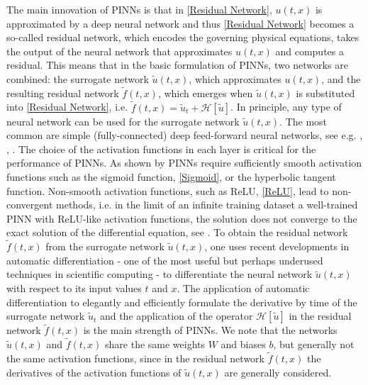 The main innovation of PINNs is that in \cref{Residual Network}, $u(t,x)$ is approximated by a deep neural network and thus \cref{Residual Network} becomes a so-called residual network, which encodes the governing physical equations, takes the output of the neural network that approximates $u(t,x)$ and computes a residual. This means that in the basic formulation of PINNs, two networks are combined: the surrogate network $\widetilde{u}(t,x)$, which approximates $u(t,x)$, and the resulting residual network $\widetilde{f}(t,x)$, which emerges when $\widetilde{u}(t,x)$ is substituted into \cref{Residual Network}, i.e. $\widetilde{f}(t,x) = \widetilde{u}_t + \mathcal{H} \left[ \widetilde{u} \right]$. In principle, any type of neural network can be used for the surrogate network $\widetilde{u}(t,x)$. The most common are simple (fully-connected) deep feed-forward neural networks, see e.g. \cite{RaissiPerdikarisKarniadakis:2019}, \cite{MishraMolinaro:2021}, \cite{Markidis:2021}. The choice of the activation functions in each layer is critical for the performance of PINNs. As shown by \cite{MishraMolinaro:2021} PINNs require sufficiently smooth activation functions such as the sigmoid function, \cref{Sigmoid}, or the hyperbolic tangent function. Non-smooth activation functions, such as ReLU, \cref{ReLU}, lead to non-convergent methods, i.e. in the limit of an infinite training dataset a well-trained PINN with ReLU-like activation functions, the solution does not converge to the exact solution of the differential equation, see \cite{MishraMolinaro:2021}. To obtain the residual network $\widetilde{f}(t,x)$ from the surrogate network $\widetilde{u}(t,x)$, one uses recent developments in automatic differentiation - one of the most useful but perhaps underused techniques in scientific computing - to differentiate the neural network $\widetilde{u}(t,x)$ with respect to its input values $t$ and $x$. The application of automatic differentiation to elegantly and efficiently formulate the derivative by time of the surrogate network $\widetilde{u}_t$ and the application of the operator $\mathcal{H} \left[ \widetilde{u} \right]$ in the residual network $\widetilde{f}(t,x)$ is the main strength of PINNs. We note that the networks $\widetilde{u}(t,x)$ and $\widetilde{f}(t,x)$ share the same weights $W$ and biases $b$, but generally not the same activation functions, since in the residual network $\widetilde{f}(t,x)$ the derivatives of the activation functions of $\widetilde{u}(t,x)$ are generally considered.  \\

